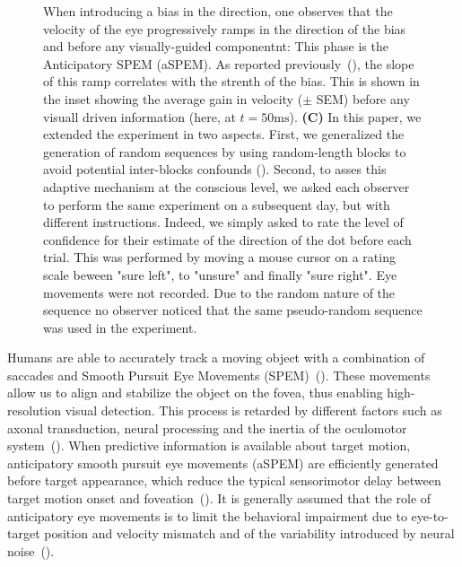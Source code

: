 \documentclass[profile,final,english, draft]{article}%
\newcommand{\ms}{\si{\milli\second}}%
\newcommand{\citep}[1]{(\cite{#1})}
\begin{document}
\begin{figure}
{When introducing a bias in the direction,
one observes that the velocity of the eye progressively ramps
in the direction of the bias and before any visually-guided componentnt:
This phase is the Anticipatory SPEM (aSPEM).
As reported previously~\citep{Montagnini2010, SantosKowler2017},
the slope of this ramp correlates with the strenth of the bias.
This is shown in the inset showing the average gain in velocity ($\pm$ SEM)
before any visuall driven information (here, at $t=50 \ms$).
\textbf{(C)} In this paper, we extended the experiment in two aspects.
First, we generalized the generation of random sequences
by using random-length blocks to avoid potential inter-blocks confounds ().
Second, to asses this adaptive mechanism at the conscious level,
we asked each observer to perform the same experiment on a subsequent day,
but with different instructions.
Indeed, we simply asked to rate the level of confidence for their estimate of the direction of the dot before each trial.
This was performed by moving a mouse cursor on a rating scale beween "sure left", to "unsure" and finally "sure right".
Eye movements were not recorded.
Due to the random nature of the sequence no observer noticed that the same pseudo-random sequence was used in the experiment.
 }
\label{fig:intro}
\end{figure}
Humans are able to accurately track a moving object
with a combination of saccades and
Smooth Pursuit Eye Movements (SPEM)~\citep{ref}.
These movements allow us to align and
stabilize the object on the fovea,
thus enabling high-resolution visual detection.
This process is retarded by different factors such as axonal transduction, neural processing and the inertia of the oculomotor system~\citep{Krauzlis}.
When predictive information is available about target motion,
anticipatory smooth pursuit eye movements (aSPEM) are
efficiently generated before target appearance,
which reduce the typical sensorimotor delay
between target motion onset and foveation~\citep{PerrinetAdamasFriston2014}.
It is generally assumed that the role of anticipatory eye movements is
to limit the behavioral impairment due
to eye-to-target position and velocity mismatch and
of the variability introduced by neural noise~\citep{WolpertXXX}.
\end{document}
